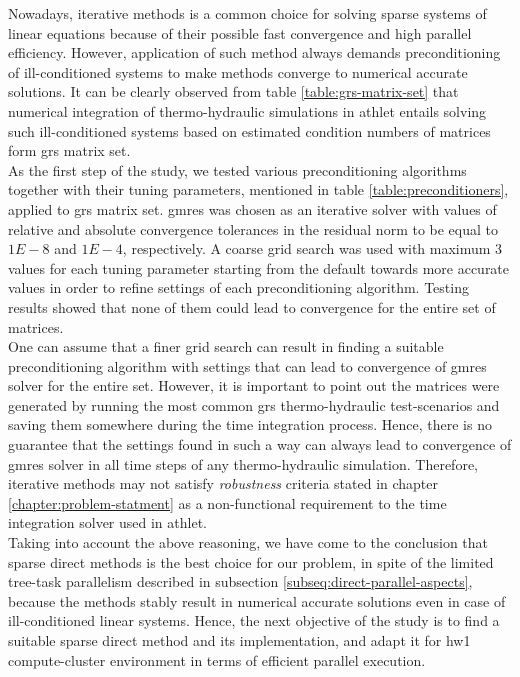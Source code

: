 \label{subseq:hybrid-method-description}

Nowadays, iterative methods is a common choice for solving sparse systems of linear equations because of their possible fast convergence and high parallel efficiency. However, application of such method always demands preconditioning of ill-conditioned systems to make methods converge to numerical accurate solutions. It can be clearly observed from table \ref{table:grs-matrix-set} that numerical integration of thermo-hydraulic simulations in \acrshort{athlet} entails solving such ill-conditioned systems  based on estimated condition numbers of matrices form \acrshort{grs} matrix set.\\


As the first step of the study, we tested various preconditioning algorithms together with their tuning parameters, mentioned in table \ref{table:preconditioners}, applied to \acrshort{grs} matrix set. \acrshort{gmres} was chosen as an iterative solver with values of relative and absolute convergence tolerances in the residual norm to be equal to $1E-8$ and $1E-4$, respectively. A coarse grid search was used with maximum 3 values for each tuning parameter starting from the default towards more accurate values in order to refine settings of each preconditioning algorithm. Testing results showed that none of them could lead to convergence for the entire set of matrices.\\


One can assume that a finer grid search can result in finding a suitable preconditioning algorithm with settings that can lead to convergence of \acrshort{gmres} solver for the entire set. However, it is important to point out the matrices were generated by running the most common \acrshort{grs} thermo-hydraulic test-scenarios and saving them somewhere during the time integration process. Hence, there is no guarantee that the settings found in such a way can always lead to convergence of \acrshort{gmres} solver in all time steps of any thermo-hydraulic simulation. Therefore, iterative methods may not satisfy \textit{robustness} criteria stated in chapter \ref{chapter:problem-statment} as a non-functional requirement to the time integration solver used in \acrshort{athlet}.\\


Taking into account the above reasoning, we have come to the conclusion that sparse direct methods is the best choice for our problem, in spite of the limited tree-task parallelism described in subsection \ref{subseq:direct-parallel-aspects}, because the methods stably result in numerical accurate solutions even in case of ill-conditioned linear systems. Hence, the next objective of the study is to find a suitable sparse direct method and its implementation, and adapt it for \gls{hw1} compute-cluster environment in terms of efficient parallel execution. \\
